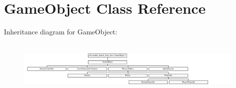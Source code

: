\hypertarget{class_game_object}{}\section{Game\+Object Class Reference}
\label{class_game_object}
Inheritance diagram for Game\+Object\+:\begin{figure}[H]
\begin{center}
\leavevmode
\includegraphics[height=2.695548cm]{d0/dd1/class_game_object}
\end{center}
\end{figure}
